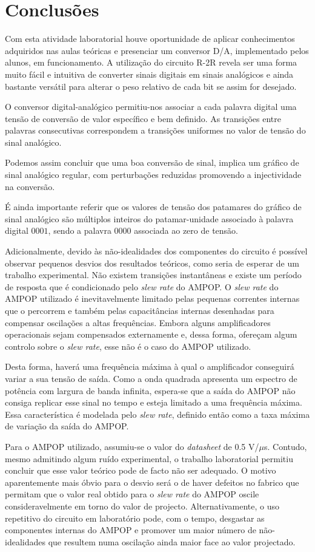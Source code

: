 \documentclass[a4paper,11pt]{report}
\begin{document}
\chapter{Conclusões}

Com esta atividade laboratorial houve oportunidade de aplicar conhecimentos adquiridos nas aulas teóricas e presenciar um conversor D/A, implementado pelos alunos, em funcionamento. A utilização do circuito R-2R revela ser uma forma muito fácil e intuitiva de converter sinais digitais em sinais analógicos e ainda bastante versátil para alterar o peso relativo de cada bit se assim for desejado.\par
O conversor digital-analógico permitiu-nos associar a cada palavra digital uma tensão de conversão de valor específico e bem definido. As transições entre palavras consecutivas correspondem a transições uniformes no valor de tensão do sinal analógico. \par Podemos assim concluir que uma boa conversão de sinal, implica um gráfico de sinal analógico regular, com perturbações reduzidas promovendo a injectividade na conversão. \par É ainda importante referir que os valores de tensão dos patamares do gráfico de sinal analógico são múltiplos inteiros do patamar-unidade associado à palavra digital $0001$, sendo a palavra $0000$ associada ao zero de tensão.\par
Adicionalmente, devido às não-idealidades dos componentes do circuito é possível observar pequenos desvios dos resultados teóricos, como seria de esperar de um trabalho experimental. Não existem transições instantâneas e existe um período de resposta que é condicionado pelo \textit{slew rate} do AMPOP. O \textit{slew rate} do AMPOP utilizado é inevitavelmente limitado pelas pequenas correntes internas que o percorrem e também pelas capacitâncias internas desenhadas para compensar oscilações a altas frequências. Embora alguns amplificadores operacionais sejam compensados externamente e, dessa forma, ofereçam algum controlo sobre o \textit{slew rate}, esse não é o caso do AMPOP utilizado.\par
Desta forma, haverá uma frequência máxima à qual o amplificador conseguirá variar a sua tensão de saída. Como a onda quadrada apresenta um espectro de potência com largura de banda infinita, espera-se que a saída do AMPOP não consiga replicar esse sinal no tempo e esteja limitado a uma frequência máxima. Essa característica é modelada pelo \textit{slew rate}, definido então como a taxa máxima de variação da saída do AMPOP.\par
Para o AMPOP utilizado, assumiu-se o valor do \textit{datasheet} de 0.5 V/$\mu$s. Contudo, mesmo admitindo algum ruído experimental, o trabalho laboratorial permitiu concluir que esse valor teórico pode de facto não ser adequado. O motivo aparentemente mais óbvio para o desvio será o de haver defeitos no fabrico que permitam que o valor real obtido para o \textit{slew rate} do AMPOP oscile consideravelmente em torno do valor de projecto. Alternativamente, o uso repetitivo do circuito em laboratório pode, com o tempo, desgastar as componentes internas do AMPOP e promover um maior número de não-idealidades que resultem numa oscilação ainda maior face ao valor projectado.
\end{document}
